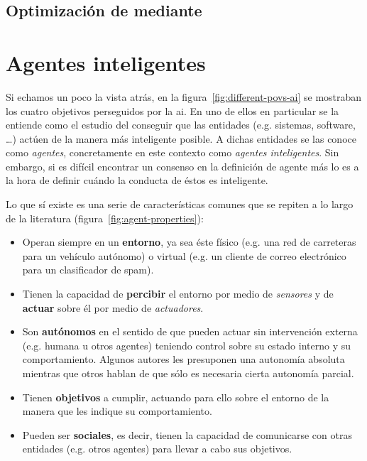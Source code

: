 \subsection{Optimización de  mediante }

\section{Agentes inteligentes}
\label{ch:ci:s:agent-concept}

Si echamos un poco la vista atrás, en la figura~\ref{fig:different-povs-ai} se mostraban los cuatro objetivos perseguidos por la \ac{ai}. En uno de ellos en particular se la entiende como el estudio del conseguir que las entidades (e.g. sistemas, software, \ldots) actúen de la manera más inteligente posible. A dichas entidades se las conoce como \textit{agentes}, concretamente en este contexto como \textit{agentes inteligentes}. Sin embargo, si es difícil encontrar un consenso en la definición de agente más lo es a la hora de definir cuándo la conducta de éstos es inteligente.

Lo que sí existe es una serie de características comunes que se repiten a lo largo de la literatura (figura~\ref{fig:agent-properties}):

\begin{itemize}
	\item Operan siempre en un \textbf{entorno}, ya sea éste físico (e.g. una red de carreteras para un vehículo autónomo) o virtual (e.g. un cliente de correo electrónico para un clasificador de spam).
	\item Tienen la capacidad de \textbf{percibir} el entorno por medio de \textit{sensores} y de \textbf{actuar} sobre él por medio de \textit{actuadores}.
	\item Son \textbf{autónomos} en el sentido de que pueden actuar sin intervención externa (e.g. humana u otros agentes) teniendo control sobre su estado interno y su comportamiento. Algunos autores les presuponen una autonomía absoluta mientras que otros hablan de que sólo es necesaria cierta autonomía parcial.
	\item Tienen \textbf{objetivos} a cumplir, actuando para ello sobre el entorno de la manera que les indique su comportamiento.
	\item Pueden ser \textbf{sociales}, es decir, tienen la capacidad de comunicarse con otras entidades (e.g. otros agentes) para llevar a cabo sus objetivos.
\end{itemize}

